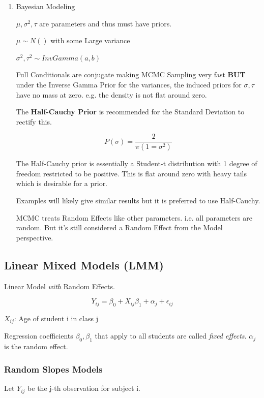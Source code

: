 \documentclass[11pt]{article}
\begin{document}
\begin{enumerate}
\item Bayesian Modeling
\label{sec:org3d0eaba}

\(\mu, \sigma^2, \tau\) are parameters and thus must have priors.



\(\mu \sim N()\) with some Large variance

\(\sigma^2, \tau^2 \sim InvGamma(a, b)\)

Full Conditionals are conjugate making MCMC Sampling very fast \textbf{BUT} under the
Inverse Gamma Prior for the variances, the induced priors for \(\sigma, \tau\)
have no mass at zero. e.g. the density is not flat around zero.

The \textbf{Half-Cauchy Prior} is recommended for the Standard Deviation to rectify
this.

$$
P(\sigma) = \frac{2}{\pi (1 = \sigma^2)}
$$

The Half-Cauchy prior is essentially a Student-t distribution with 1 degree of
freedom restricted to be positive. This is flat around zero with heavy tails
which is desirable for a prior.

Examples will likely give similar results but it is preferred to use Half-Cauchy.

MCMC treats Random Effects like other parameters. i.e. all parameters are
random. But it's still considered a Random Effect from the Model perspective.
\end{enumerate}


\subsection{Linear Mixed Models (LMM)}
\label{sec:orgcca6b47}

Linear Model \emph{with} Random Effects.

$$
Y_{ij} = \beta_0 + X_{ij} \beta_1 + \alpha_j + \epsilon_{ij}
$$

\(X_{ij}\): Age of student i in class j

Regression coefficients \(\beta_0, \beta_1\) that apply to all students are called
\emph{fixed effects}. \(\alpha_j\) is the random effect.

\subsubsection{Random Slopes Models}
\label{sec:org4f52e94}

Let \(Y_{ij}\) be the j-th observation for subject i.
\end{document}
